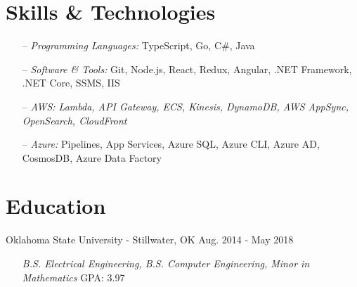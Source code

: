 \documentclass[line,overlapped]{res}
\begin{document}
\begin{resume}
  \section{Skills \& Technologies}
  \begin{itemize}
    \setlength\itemsep{.1em}
    \item[--] {\sl Programming Languages:} TypeScript, Go, C\#, Java 
    \item[--] {\sl Software \& Tools:} Git, Node.js, React, Redux, Angular, .NET Framework, .NET Core,
      SSMS, IIS
    \item[--] {\sl AWS: Lambda, API Gateway, ECS, Kinesis, DynamoDB, AWS AppSync, OpenSearch, CloudFront}
    \item[--] {\sl Azure:} Pipelines, App Services, Azure SQL,
      Azure CLI, Azure AD, CosmosDB, Azure Data Factory
  \end{itemize}

  \section{Education}
  Oklahoma State University - Stillwater, OK \hfill Aug. 2014 - May 2018
  \begin{itemize}
    \setlength\itemsep{.1em}
    \item[]{\sl B.S. Electrical Engineering, B.S. Computer Engineering, Minor in Mathematics} \hfill GPA: 3.97
  \end{itemize}

\end{resume}
\end{document}

